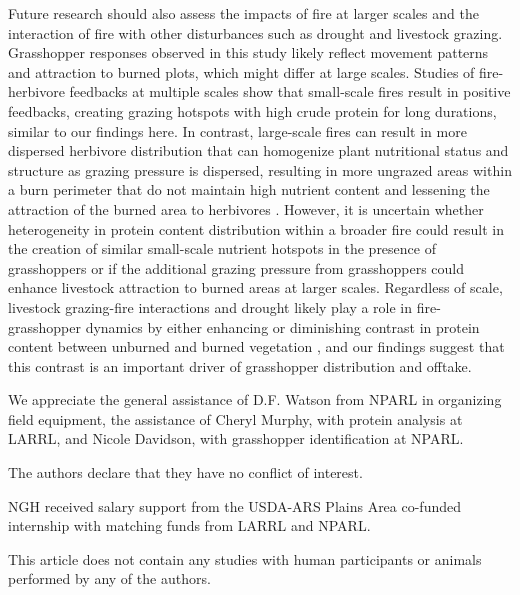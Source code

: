 \documentclass[referee, 
	            sn-basic]
           {sn-jnl}
\begin{document}
\begin{linenumbers}
Future research should also assess the impacts of fire at larger scales and the interaction of fire with other disturbances such as drought and livestock grazing. Grasshopper responses observed in this study likely reflect movement patterns and attraction to burned plots, which might differ at large scales. Studies of fire-herbivore feedbacks at multiple scales show that small-scale fires result in positive feedbacks, creating grazing hotspots with high crude protein for long durations, similar to our findings here\citep{cromsigt2008}. In contrast, large-scale fires can result in more dispersed herbivore distribution that can homogenize plant nutritional status and structure as grazing pressure is dispersed, resulting in more ungrazed areas within a burn perimeter that do not maintain high nutrient content \citep{archibald2005} and lessening the attraction of the burned area to herbivores \citep{donaldson2018}. However, it is uncertain whether heterogeneity in protein content distribution within a broader fire could result in the creation of similar small-scale nutrient hotspots in the presence of grasshoppers or if the additional grazing pressure from grasshoppers could enhance livestock attraction to burned areas at larger scales. Regardless of scale, livestock grazing-fire interactions \citep{onsager2000a, oneill2003} and drought likely play a role in fire-grasshopper dynamics by either enhancing or diminishing contrast in protein content between unburned and burned vegetation \citep{augustine2014, yoganand2014, ozment2021}, and our findings suggest that this contrast is an important driver of grasshopper distribution and offtake. 



\backmatter



We appreciate the general assistance of D.F. Watson from NPARL in organizing field equipment, the assistance of Cheryl Murphy, with protein analysis at LARRL, and Nicole Davidson, with grasshopper identification at NPARL. 



The authors declare that they have no conflict of interest.


NGH received salary support from the USDA-ARS Plains Area co-funded internship with matching funds from LARRL and NPARL. 


This article does not contain any studies with human participants or animals performed by any of the authors.  


\end{linenumbers}
\end{document}
